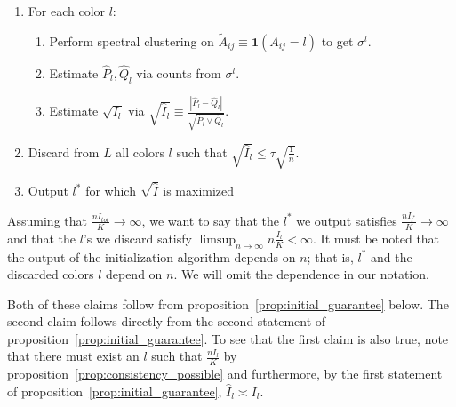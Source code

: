 \documentclass{article}
\begin{document}
\begin{enumerate}
\item For each color $l$:
  \begin{enumerate}
   \item Perform spectral clustering on $\tilde{A}_{ij} \equiv \mathbf{1}(A_{ij} = l)$ to get $\sigma^l$. 
   \item Estimate $\hat{P}_l, \hat{Q}_l$ via counts from $\sigma^l$. 
   \item Estimate $\sqrt{I_l}$ via 
  $\sqrt{ \hat{I}_l } \equiv \frac{| \hat{P}_l - \hat{Q}_l |}{\sqrt{ \hat{P}_l \vee \hat{Q}_l}}$. 
   \end{enumerate}
\item Discard from $L$ all colors $l$ such that $\sqrt{\hat{I}_l} \leq \tau \sqrt{ \frac{1}{n}}$.
\item Output $l^*$ for which $\sqrt{\hat{I}}$ is maximized
\end{enumerate}

Assuming that $ \frac{n I_{tot}}{K} \rightarrow \infty$, we want to say that the $l^*$ we output satisfies $\frac{n I_{l^*}}{K} \rightarrow \infty $ and that the $l$'s we discard satisfy $\limsup_{n \rightarrow \infty} n \frac{I_l}{K} < \infty$. It must be noted that the output of the initialization algorithm depends on $n$; that is, $l^*$ and the discarded colors $l$ depend on $n$. We will omit the dependence in our notation. 


Both of these claims follow from proposition~\ref{prop:initial_guarantee} below. The second claim follows directly from the second statement of proposition~\ref{prop:initial_guarantee}. To see that the first claim is also true, note that there must exist an $l$ such that $\frac{n I_l}{K}$ by proposition~\ref{prop:consistency_possible} and furthermore, by the first statement of proposition~\ref{prop:initial_guarantee}, $\hat{I}_{l} \asymp I_{l}$. 
\end{document}
